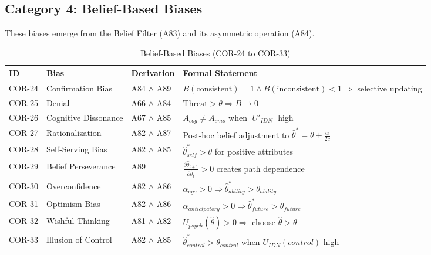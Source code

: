 
\subsection{Category 4: Belief-Based Biases}

These biases emerge from the Belief Filter (A83) and its asymmetric operation (A84).

\begin{table}[htbp]
\small
\centering
\caption{Belief-Based Biases (COR-24 to COR-33)}
\label{tab:cor-belief}
\begin{tabular}{p{1.2cm}p{2.8cm}p{3.8cm}p{5cm}}
\toprule
\textbf{ID} & \textbf{Bias} & \textbf{Derivation} & \textbf{Formal Statement} \\
\midrule
COR-24 & Confirmation Bias & A84 $\land$ A89 & $B(\text{consistent}) = 1 \land B(\text{inconsistent}) < 1 \Rightarrow$ selective updating \\
COR-25 & Denial & A66 $\land$ A84 & $\text{Threat} > \theta \Rightarrow B \to 0$ \\
COR-26 & Cognitive Dissonance & A67 $\land$ A85 & $A_{cog} \neq A_{emo}$ when $|U'_{IDN}|$ high \\
COR-27 & Rationalization & A82 $\land$ A87 & Post-hoc belief adjustment to $\hat{\theta}^* = \theta + \frac{\alpha}{2c}$ \\
COR-28 & Self-Serving Bias & A82 $\land$ A85 & $\hat{\theta}^*_{self} > \theta$ for positive attributes \\
COR-29 & Belief Perseverance & A89 & $\frac{\partial \hat{\theta}_{t+1}}{\partial \hat{\theta}_t} > 0$ creates path dependence \\
COR-30 & Overconfidence & A82 $\land$ A86 & $\alpha_{ego} > 0 \Rightarrow \hat{\theta}^*_{ability} > \theta_{ability}$ \\
COR-31 & Optimism Bias & A82 $\land$ A86 & $\alpha_{anticipatory} > 0 \Rightarrow \hat{\theta}^*_{future} > \theta_{future}$ \\
COR-32 & Wishful Thinking & A81 $\land$ A82 & $U_{psych}(\hat{\theta}) > 0 \Rightarrow$ choose $\hat{\theta} > \theta$ \\
COR-33 & Illusion of Control & A82 $\land$ A85 & $\hat{\theta}^*_{control} > \theta_{control}$ when $U_{IDN}(control)$ high \\
\bottomrule
\end{tabular}
\end{table}

